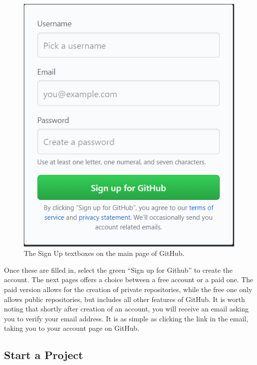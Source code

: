 \documentclass[11pt]{article}
\begin{document}
\begin{figure}[h!]
\begin{center}
\includegraphics[scale=.5]{GithubSignup.png} 
\caption{The Sign Up textboxes on the main page of GitHub.}
\end{center}
\end{figure} 

Once these are filled in, select the green ``Sign up for Github'' to create the account. The next pages offers a choice between a free account or a paid one. The paid version allows for the creation of private repositories, while the free one only allows public repositories, but includes all other features of GitHub. It is worth noting that shortly after creation of an account, you will receive an email asking you to verify your email address. It is as simple as clicking the link in the email, taking you to your account page on GitHub.

\subsection{Start a Project}
\end{document}
